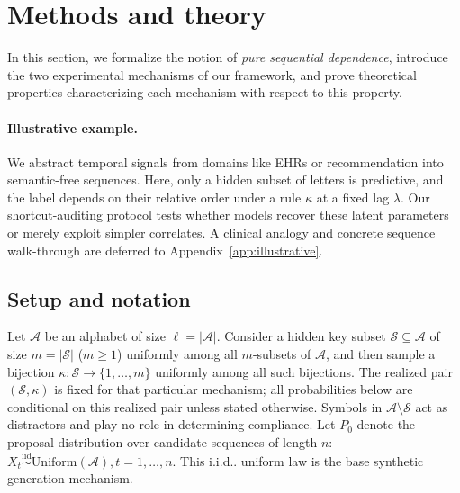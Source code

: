 \documentclass{article} %
\makeatletter
\def\@onedot{\ifx\@let@token.\else.\null\fi\xspace}
\def\onedot{\futurelet\@let@token\@onedot}
\def\iid{i.i.d\onedot} \def\wolog{w.l.o.g\onedot}
\theoremstyle{plain}
\theoremstyle{definition}
\theoremstyle{remark}
\makeatother
\begin{document}
\section{Methods and theory}
\label{sec:formulation}
In this section, we formalize the notion of \textit{pure sequential dependence}, introduce the two experimental mechanisms of our framework, and prove theoretical properties characterizing each mechanism with respect to this property.

\paragraph{Illustrative example.}
We abstract temporal signals from domains like EHRs or recommendation into semantic-free sequences. Here, only a hidden subset of letters is predictive, and the label depends on their relative order under a rule $\kappa$ at a fixed lag $\lambda$. Our shortcut-auditing protocol tests whether models recover these latent parameters or merely exploit simpler correlates. A clinical analogy and concrete sequence walk-through are deferred to Appendix~\ref{app:illustrative}.

\subsection{Setup and notation}
\label{sec:setup}

Let $\mathcal{A}$ be an alphabet of size $\ell = |\mathcal{A}|$. Consider a hidden key subset $\mathcal{S} \subseteq \mathcal{A}$ of size $m = |\mathcal{S}|$ ($m \geq 1$) uniformly among all $m$-subsets of $\mathcal{A}$, and then sample a bijection $\kappa : \mathcal{S} \to \{1,\ldots,m\}$ uniformly among all such bijections. The realized pair $(\mathcal{S},\kappa)$ is fixed for that particular mechanism; all probabilities below are conditional on this realized pair unless stated otherwise. Symbols in $\mathcal{A}\setminus\mathcal{S}$ act as distractors and play no role in determining compliance. Let $P_0$ denote the proposal distribution over candidate sequences of length $n$: $X_t \stackrel{\mathrm{iid}}{\sim} \mathrm{Uniform}(\mathcal{A}), t=1,\ldots,n.$ This \iid uniform law is the base synthetic generation mechanism.
\end{document}
